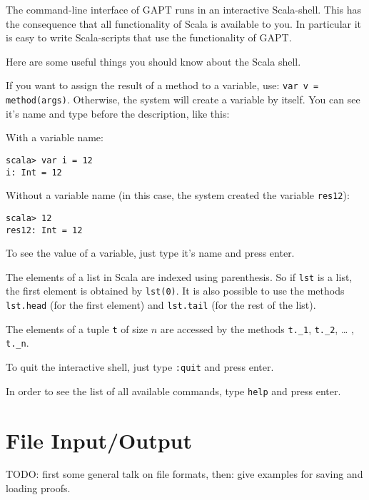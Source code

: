 \documentclass[a4paper,11pt]{article}
\newenvironment{meta}{\color{red}}{\color{black}}
\begin{document}
The command-line interface of GAPT runs in an interactive Scala-shell. This
has the consequence that all functionality of Scala is available to you. In
particular it is easy to write Scala-scripts that use the functionality of GAPT.

Here are some useful things you should know about the Scala shell.

If you want to assign the result of a method to a variable, use: 
\texttt{var v = method(args)}. Otherwise, the system will create a variable by 
itself. You can see it's name and type before the description, like this:

With a variable name:

\begin{lstlisting}
scala> var i = 12
i: Int = 12
\end{lstlisting}

Without a variable name (in this case, the system created the variable \texttt{res12}):

\begin{lstlisting}
scala> 12
res12: Int = 12
\end{lstlisting}

To see the value of a variable, just type it’s name and press enter.

The elements of a list in Scala are indexed using parenthesis. So if \texttt{lst} 
is a list, the first element is obtained by \texttt{lst(0)}. It is also possible 
to use the methods \texttt{lst.head} (for the first element) and \texttt{lst.tail} 
(for the rest of the list).

The elements of a tuple \texttt{t} of size $n$ are accessed by the methods 
\texttt{t.\_1}, \texttt{t.\_2}, … , \texttt{t.\_n}.

To quit the interactive shell, just type \texttt{:quit} and press enter.

In order to see the list of all available commands, type \texttt{help} and
press enter.

\section{File Input/Output}

\begin{meta}
TODO: first some general talk on file formats, then: give examples for saving and loading
proofs.
\end{meta}
\end{document}
